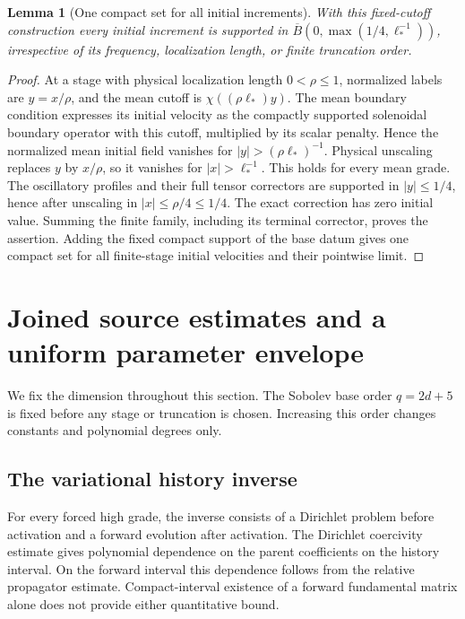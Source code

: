 \documentclass[11pt]{article}
\newtheorem{lemma}[theorem]{Lemma}
\theoremstyle{definition}
\begin{document}
\begin{lemma}[One compact set for all initial increments]\label{lem:common-support}
With this fixed-cutoff construction every initial increment is supported
in $\overline B(0,\max(1/4,\ell_*^{-1}))$, irrespective of its
frequency, localization length, or finite truncation order.
\end{lemma}
\begin{proof}
At a stage with physical localization length $0<\rho\leq1$, normalized
labels are $y=x/\rho$, and the mean cutoff is
$\chi((\rho\ell_*)y)$. The mean boundary condition expresses
its initial velocity as the compactly supported solenoidal boundary
operator with this cutoff, multiplied by its scalar penalty.
Hence the normalized mean initial field vanishes for
$|y|>(\rho\ell_*)^{-1}$. Physical unscaling replaces $y$ by $x/\rho$,
so it vanishes for $|x|>\ell_*^{-1}$. This holds for every
mean grade. The oscillatory profiles and their full tensor correctors
are supported in $|y|\leq1/4$, hence after unscaling in
$|x|\leq\rho/4\leq1/4$. The exact correction has zero initial value.
Summing the finite family, including its
terminal corrector, proves the assertion. Adding the fixed compact
support of the base datum gives one compact set for all finite-stage
initial velocities and their pointwise limit.
\end{proof}
\section{Joined source estimates and a uniform parameter envelope}
\label{sec:parameter-envelope}

We fix the dimension throughout this section. The Sobolev base order
$q=2d+5$ is fixed before any stage or truncation is chosen. Increasing this
order changes constants and polynomial degrees only.

\subsection{The variational history inverse}

For every forced high grade, the inverse consists of a Dirichlet problem
before activation and a forward evolution after activation. The Dirichlet
coercivity estimate gives polynomial dependence on the parent coefficients
on the history interval. On the forward interval this dependence follows
from the relative propagator estimate. Compact-interval existence of a
forward fundamental matrix alone does not provide either quantitative bound.
\end{document}
